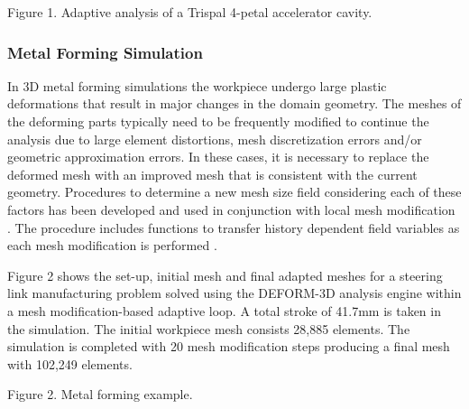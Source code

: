 Figure 1. Adaptive analysis of a Trispal 4-petal accelerator cavity.


\subsubsection{Metal Forming Simulation}

In 3D metal forming simulations the workpiece undergo large
plastic deformations that result in major changes in the
domain geometry. The meshes of the deforming parts typically need to
be frequently modified to continue the analysis due to large element
distortions, mesh discretization errors and/or geometric approximation
errors. In these cases, it is necessary to replace the deformed mesh
with an improved mesh that is consistent with the current geometry.
Procedures to determine a new mesh size field
considering each of these factors has been developed and used in
conjunction with local mesh modification \cite{WaSh05}. The procedure includes
functions to transfer history dependent field variables as each mesh
modification is performed \cite{WaSh05}.

Figure 2 shows the set-up, initial mesh and final adapted meshes for a
steering link manufacturing problem solved using the DEFORM-3D
analysis engine \cite{Fl04} within a mesh modification-based adaptive
loop. A total stroke of 41.7mm is taken in the simulation. The initial
workpiece mesh consists 28,885 elements. The simulation is completed
with 20 mesh modification steps producing a final mesh with 102,249
elements.



Figure 2. Metal forming example.

